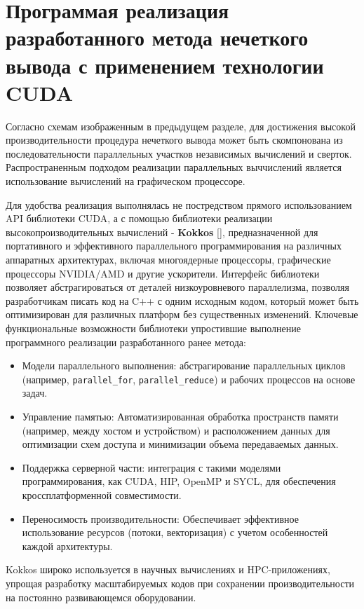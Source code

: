 \chapter{Программая реализация разработанного метода нечеткого вывода с применением технологии CUDA}\label{ch:ch3}

Согласно схемам \cite{} изображенным в предыдущем разделе, для достижения высокой производительности процедура нечеткого вывода может быть скомпонована из последовательности параллельных участков независимых вычислений и сверток. Распространенным подходом реализации параллельных выччислений является использование вычислений на графическом процессоре.

Для удобства реализация выполнялась не постредством прямого использованием API библиотеки CUDA, а с помощью библиотеки реализации высокопроизводительных вычислений - \textbf{Kokkos} \ref{}, предназначенной для портативного и эффективного параллельного программирования на различных аппаратных архитектурах, включая многоядерные процессоры, графические процессоры NVIDIA/AMD и другие ускорители. Интерфейс библиотеки позволяет абстрагироваться от деталей низкоуровневого параллелизма, позволяя разработчикам писать код на C++ с одним исходным кодом, который может быть оптимизирован для различных платформ без существенных изменений. 
Ключевые функциональные возможности библиотеки упростившие выполнение программного реализации разработанного ранее метода:
\begin{itemize}
\item Модели параллельного выполнения: абстрагирование параллельных циклов (например, \lstinline{parallel_for}, \lstinline{parallel_reduce}) и рабочих процессов на основе задач.  
\item Управление памятью: Автоматизированная обработка пространств памяти (например, между хостом и устройством) и расположением данных для оптимизации схем доступа и минимизации объема передаваемых данных.  
\item Поддержка серверной части: интеграция с такими моделями программирования, как CUDA, HIP, OpenMP и SYCL, для обеспечения кроссплатформенной совместимости.  
\item Переносимость производительности: Обеспечивает эффективное использование ресурсов (потоки, векторизация) с учетом особенностей каждой архитектуры.
\end{itemize}

Kokkos широко используется в научных вычислениях и HPC-приложениях, упрощая разработку масштабируемых кодов при сохранении производительности на постоянно развивающемся оборудовании. 

